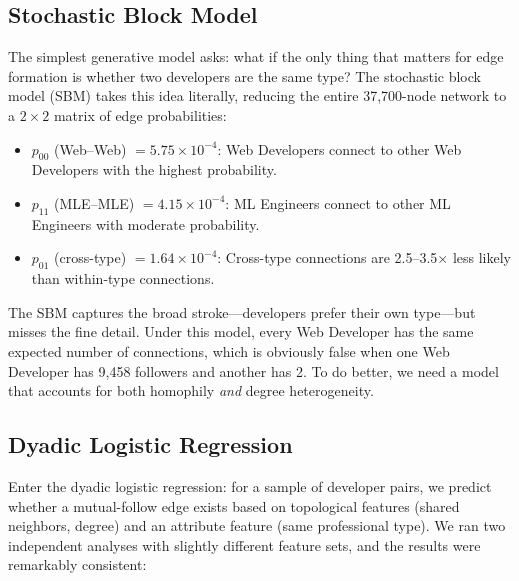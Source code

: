 \documentclass[letterpaper]{article}
\begin{document}
\subsection{Stochastic Block Model}

The simplest generative model asks: what if the only thing that matters for edge formation is whether two developers are the same type? The stochastic block model (SBM) takes this idea literally, reducing the entire 37,700-node network to a $2 \times 2$ matrix of edge probabilities:

\begin{itemize}
  \item $p_{00}$ (Web--Web) $= 5.75 \times 10^{-4}$: Web Developers connect to other Web Developers with the highest probability.
  \item $p_{11}$ (MLE--MLE) $= 4.15 \times 10^{-4}$: ML Engineers connect to other ML Engineers with moderate probability.
  \item $p_{01}$ (cross-type) $= 1.64 \times 10^{-4}$: Cross-type connections are 2.5--3.5$\times$ less likely than within-type connections.
\end{itemize}

The SBM captures the broad stroke---developers prefer their own type---but misses the fine detail. Under this model, every Web Developer has the same expected number of connections, which is obviously false when one Web Developer has 9,458 followers and another has 2. To do better, we need a model that accounts for both homophily \emph{and} degree heterogeneity.

\subsection{Dyadic Logistic Regression}

Enter the dyadic logistic regression: for a sample of developer pairs, we predict whether a mutual-follow edge exists based on topological features (shared neighbors, degree) and an attribute feature (same professional type). We ran two independent analyses with slightly different feature sets, and the results were remarkably consistent:
\end{document}
